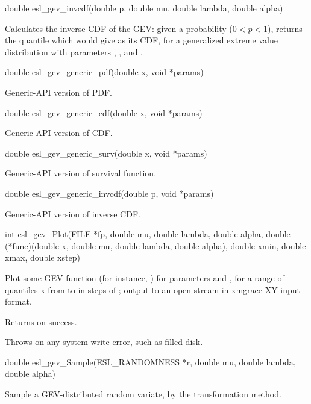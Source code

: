 \begin{sreapi}
\hypertarget{func:esl_gev_invcdf()}
{\item[double esl\_gev\_invcdf(double p, double mu, double lambda, double alpha)]}

Calculates the inverse CDF of the GEV: given a probability
 ($0 < p < 1$), returns the quantile  which would
give  as its CDF, for a generalized extreme value 
distribution with parameters , , and .


\hypertarget{func:esl_gev_generic_pdf()}
{\item[double esl\_gev\_generic\_pdf(double x, void *params)]}

Generic-API version of PDF.


\hypertarget{func:esl_gev_generic_cdf()}
{\item[double esl\_gev\_generic\_cdf(double x, void *params)]}

Generic-API version of CDF.


\hypertarget{func:esl_gev_generic_surv()}
{\item[double esl\_gev\_generic\_surv(double x, void *params)]}

Generic-API version of survival function.


\hypertarget{func:esl_gev_generic_invcdf()}
{\item[double esl\_gev\_generic\_invcdf(double p, void *params)]}

Generic-API version of inverse CDF.


\hypertarget{func:esl_gev_Plot()}
{\item[int esl\_gev\_Plot(FILE *fp, double mu, double lambda, double alpha,
	     double (*func)(double x, double mu, double lambda, double alpha), 
	     double xmin, double xmax, double xstep)]}

Plot some GEV function  (for instance,
) for parameters  and , for
a range of quantiles x from  to  in steps of ;
output to an open stream  in xmgrace XY input format.

Returns  on success.

Throws  on any system write error, such as filled disk.


\hypertarget{func:esl_gev_Sample()}
{\item[double esl\_gev\_Sample(ESL\_RANDOMNESS *r, double mu, double lambda, double alpha)]}

Sample a GEV-distributed random variate,
by the transformation method.



\end{sreapi}

